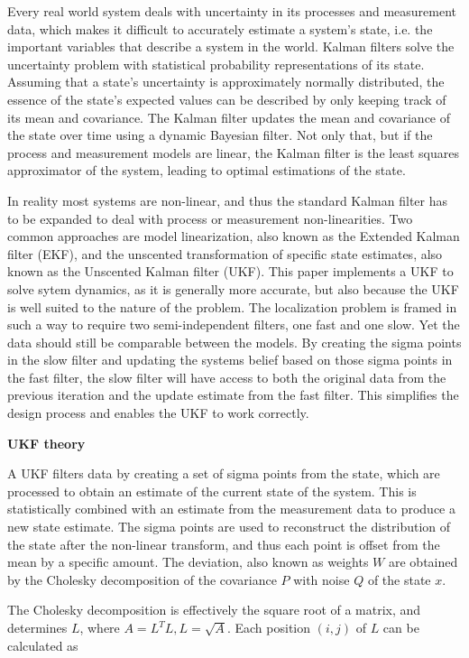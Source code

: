 Every real world system deals with uncertainty in its processes and measurement data, which makes it difficult to accurately estimate a system's state, i.e. the important variables that describe a system in the world. Kalman filters solve the uncertainty problem with statistical probability representations of its state. Assuming that a state's uncertainty is approximately normally distributed, the essence of the state's expected values can be described by only keeping track of its mean and covariance. The Kalman filter updates the mean and covariance of the state over time using a dynamic Bayesian filter. Not only that, but if the process and measurement models are linear, the Kalman filter is the least squares approximator of the system, leading to optimal estimations of the state. 

In reality most systems are non-linear, and thus the standard Kalman filter has to be expanded to deal with process or measurement non-linearities. Two common approaches are model linearization, also known as the Extended Kalman filter (EKF), and the unscented transformation of specific state estimates, also known as the Unscented Kalman filter (UKF). This paper implements a UKF to solve sytem dynamics, as it is generally more accurate, but also because the UKF is well suited to the nature of the problem. The localization problem is framed in such a way to require two semi-independent filters, one fast and one slow. Yet the data should still be comparable between the models. By creating the sigma points in the slow filter and updating the systems belief based on those sigma points in the fast filter, the slow filter will have access to both the original data from the previous iteration and the update estimate from the fast filter. This simplifies the design process and enables the UKF to work correctly.

\textbf{UKF theory}

A UKF filters data by creating a set of sigma points from the state, which are processed to obtain an estimate of the current state of the system. This is statistically combined with an estimate from the measurement data to produce a new state estimate. The sigma points are used to reconstruct the distribution of the state after the non-linear transform, and thus each point is offset from the mean by a specific amount. The deviation, also known as weights $W$ are obtained by the Cholesky decomposition of the covariance $P$ with noise $Q$ of the state $x$. 

The Cholesky decomposition is effectively the square root of a matrix, and determines $L$, where $A=L^TL, L=\sqrt{A}$. Each position $(i,j)$ of $L$ can be calculated as

